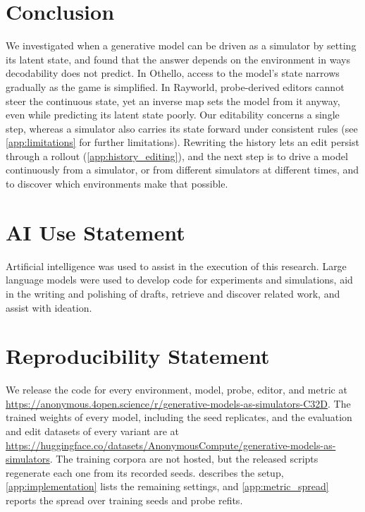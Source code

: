 \documentclass{article} %
\begin{document}
\section{Conclusion}
We investigated when a generative model can be driven as a simulator by setting its latent state, and found that the answer depends on the environment in ways decodability does not predict. In Othello, access to the model's state narrows gradually as the game is simplified. In Rayworld, probe-derived editors cannot steer the continuous state, yet an inverse map sets the model from it anyway, even while predicting its latent state poorly. Our editability concerns a single step, whereas a simulator also carries its state forward under consistent rules (see \cref{app:limitations} for further limitations). Rewriting the history lets an edit persist through a rollout (\cref{app:history_editing}), and the next step is to drive a model continuously from a simulator, or from different simulators at different times, and to discover which environments make that possible.

\newpage
\section{AI Use Statement}
\label{sec:ai_usage}
Artificial intelligence was used to assist in the execution of this research. Large language models were used to develop code for experiments and simulations, aid in the writing and polishing of drafts, retrieve and discover related work, and assist with ideation.
\section{Reproducibility Statement}
\label{sec:reproducibility}
We release the code for every environment, model, probe, editor, and metric at \url{https://anonymous.4open.science/r/generative-models-as-simulators-C32D}. The trained weights of every model, including the seed replicates, and the evaluation and edit datasets of every variant are at \url{https://huggingface.co/datasets/AnonymousCompute/generative-models-as-simulators}. The training corpora are not hosted, but the released scripts regenerate each one from its recorded seeds.  describes the setup, \cref{app:implementation} lists the remaining settings, and \cref{app:metric_spread} reports the spread over training seeds and probe refits.
\end{document}
